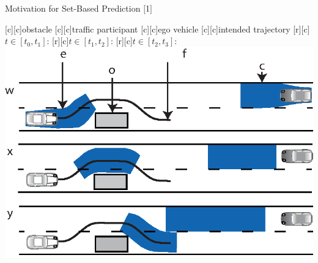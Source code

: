 \begin{frame}{Motivation for Set-Based Prediction $[$1$]$}

	\centering	
	\footnotesize
      [c][c]{obstacle}						
      [c][c]{traffic participant}
      [c][c]{ego vehicle}
      [c][c]{intended trajectory}      
      [r][c]{$t \in [t_0, t_1]$:}
      [r][c]{$t \in [t_1, t_2]$:}
      [r][c]{$t \in [t_2, t_3]$:}
      \includegraphics[width=0.8\columnwidth, height=0.74\textheight, keepaspectratio]{./figures/snapshots_blue.eps}
\end{frame}





